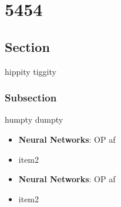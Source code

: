 \chapter{5454}
\section{Section}

hippity tiggity

\subsection{Subsection}

humpty dumpty

\begin{itemize}
\item \textbf{Neural Networks}: OP af
\item item2

\end{itemize}

\begin{itemize}
\item \textbf{Neural Networks}: OP af
\item item2

\end{itemize}


